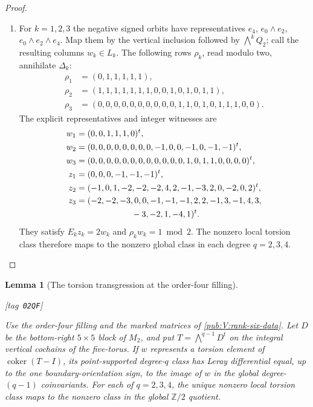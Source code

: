 \documentclass[11pt,a4paper]{article}
\numberwithin{equation}{section}
\newtheorem{lemma}[lemma]{Lemma}
\theoremstyle{definition}
\newcommand{\StatementRecord}[4]{{\upshape\footnotesize[tag~\texttt{#3}]}\enspace\ignorespaces}
\begin{document}
\begin{proof}
\begin{enumerate}[label=\arabic*.,leftmargin=*]
\item For $k=1,2,3$ the negative signed orbits have representatives
$e_4$, $e_0\wedge e_2$, $e_0\wedge e_2\wedge e_4$.
Map them by the vertical inclusion followed by $\bigwedge^kQ_2$;
call the resulting columns $w_k\in L_k$.
The following rows $\rho_k$, read modulo two, annihilate
$\Delta_k$:
\[
\begin{aligned}
\rho_1&=(0,1,1,1,1,1),\\
\rho_2&=(1,1,1,1,1,1,1,0,0,1,0,1,0,1,1),\\
\rho_3&=(0,0,0,0,0,0,0,0,0,0,1,1,0,1,0,1,1,1,0,0).
\end{aligned}
\]
The explicit representatives and integer witnesses are
\[
\begin{aligned}
w_1&=(0,0,1,1,1,0)^t,\\
w_2&=(0,0,0,0,0,0,0,0,-1,0,0,-1,0,-1,-1)^t,\\
w_3&=(0,0,0,0,0,0,0,0,0,0,0,0,1,0,1,1,0,0,0,0)^t,\\
z_1&=(0,0,0,-1,-1,-1)^t,\\
z_2&=(-1,0,1,-2,-2,-2,4,2,-1,-3,2,0,-2,0,2)^t,\\
z_3&=(-2,-2,-3,0,0,-1,-1,-1,2,2,-1,3,-1,4,3,\\
   &\hspace{23mm}-3,-2,1,-4,1)^t.
\end{aligned}
\]
They satisfy $E_kz_k=2w_k$ and $\rho_kw_k=1\bmod2$.
The nonzero local torsion class therefore maps to the nonzero global
class in each degree $q=2,3,4$.

\end{enumerate}
\end{proof}

\begin{lemma}[The torsion transgression at the order-four filling]
\hypertarget{tag-02QF}{}\label{mapsaudit:order-four-torsion-transgression}
\StatementRecord{mapsaudit:order-four-torsion-transgression}{proved}{02QF}{\cref{pub:V:rank-six-data}, \cref{pub:V:integral-restrictions}}

Use the order-four filling and the marked matrices of \cref{pub:V:rank-six-data}.
Let $D$ be the bottom-right $5\times5$ block of $M_2$, and put
$T=\bigwedge^{q-1}D^t$ on the integral vertical cochains of the
five-torus. If $w$ represents a torsion element of
$\operatorname{coker}(T-I)$, its point-supported degree-$q$ class has
Leray differential equal, up to the one boundary-orientation sign, to
the image of $w$ in the global degree-$(q-1)$ coinvariants.  For each of $q=2,3,4$, the unique nonzero local torsion class maps
to the nonzero class in the global $\mathbb Z/2$ quotient.
\end{lemma}
\end{document}
